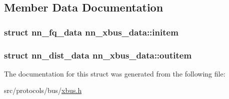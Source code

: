 \subsection{Member Data Documentation}
\subsubsection[{initem}]{\setlength{\rightskip}{0pt plus 5cm}struct {\bf nn\+\_\+fq\+\_\+data} nn\+\_\+xbus\+\_\+data\+::initem}\hypertarget{structnn__xbus__data_ad348aae27eb3db4c91f565ff8f48cf25}{}\label{structnn__xbus__data_ad348aae27eb3db4c91f565ff8f48cf25}
\subsubsection[{outitem}]{\setlength{\rightskip}{0pt plus 5cm}struct {\bf nn\+\_\+dist\+\_\+data} nn\+\_\+xbus\+\_\+data\+::outitem}\hypertarget{structnn__xbus__data_a947f1c64e4775f7e7091a1022ce1aac8}{}\label{structnn__xbus__data_a947f1c64e4775f7e7091a1022ce1aac8}


The documentation for this struct was generated from the following file\+:\begin{DoxyCompactItemize}
\item 
src/protocols/bus/\hyperlink{xbus_8h}{xbus.\+h}\end{DoxyCompactItemize}
